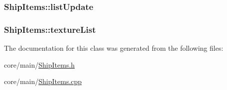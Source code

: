\hypertarget{classShipItems_ab9b7f9dcb3f50c2d724e150d5fa54cb4}{
\subsubsection[{list\-Update}]{ Ship\-Items\-::list\-Update}}\label{classShipItems_ab9b7f9dcb3f50c2d724e150d5fa54cb4}
\hypertarget{classShipItems_adb0d04e59dc21442a04199a6d0043011}{
\subsubsection[{texture\-List}]{ Ship\-Items\-::texture\-List}}\label{classShipItems_adb0d04e59dc21442a04199a6d0043011}


The documentation for this class was generated from the following files\-:\begin{DoxyCompactItemize}
\item 
core/main/\hyperlink{ShipItems_8h}{Ship\-Items.\-h}\item 
core/main/\hyperlink{ShipItems_8cpp}{Ship\-Items.\-cpp}\end{DoxyCompactItemize}
